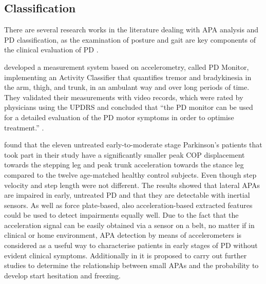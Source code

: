 \subsection{Classification}

There are several research works in the literature dealing with APA analysis and PD classification, as the examination of posture and gait are key components of the clinical evaluation of PD \cite{palmerini_classification_2013}.

\citeauthor{klerk_long-term_2009} \cite{klerk_long-term_2009} developed a measurement system based on accelerometry, called PD Monitor, implementing an Activity Classifier that quantifies tremor and bradykinesia in the arm, thigh, and trunk, in an ambulant way and over long periods of time. They validated their measurements with video records, which were rated by physicians using the UPDRS and concluded that ``the PD monitor can be used for a detailed evaluation of the PD motor symptoms in order to optimise treatment.'' \cite{klerk_long-term_2009}.

\citeauthor{mancini_anticipatory_2009} \cite{mancini_anticipatory_2009} found that the eleven untreated early-to-moderate stage Parkinson's patients that took part in their study have a significantly smaller peak COP displacement towards the stepping leg and peak trunk acceleration towards the stance leg compared to the twelve age-matched healthy control subjects. Even though step velocity and step length were not different. The results showed that lateral APAs are impaired in early, untreated PD and that they are detectable with inertial sensors. As well as force plate-based, also acceleration-based extracted features could be used to detect impairments equally well. Due to the fact that the acceleration signal can be easily obtained via a sensor on a belt, no matter if in clinical or home environment, APA detection by means of accelerometers is considered as a useful way to characterise patients in early stages of PD without evident clinical symptoms. Additionally in \cite{mancini_anticipatory_2009} it is proposed to carry out further studies to determine the relationship between small APAs and the probability to develop start hesitation and freezing.

